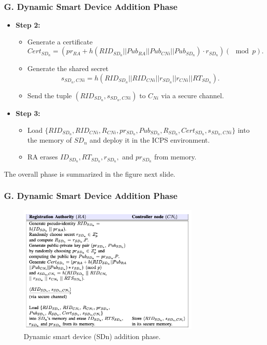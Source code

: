 \documentclass[9pt,handout]{beamer}
\begin{document}
\begin{frame}
    \frametitle{G. Dynamic Smart Device Addition Phase}
    \begin{itemize}
        
        
        \item \textbf{Step 2:} 
        \begin{itemize}
            \item Generate a certificate 
            \[
            Cert_{SD_n} = \left( pr_{RA} + h(RID_{SD_n} || Pub_{RA} || Pub_{CNi} || Pub_{SD_n}) \cdot r_{SD_n} \right) (\mod p).
            \]
            \item Generate the shared secret 
            \[
            s_{SD_n,CNi} = h(RID_{SD_n} || RID_{CNi} || r_{SD_n} || r_{CNi} || RT_{SD_n}).
            \]
            \item Send the tuple \( (RID_{SD_n}, s_{SD_n,CNi}) \) to \( C_{Ni} \) via a secure channel.
        \end{itemize}

        \item \textbf{Step 3:} 
        \begin{itemize}
            \item Load \( \{RID_{SD_n}, RID_{CNi}, R_{CNi}, pr_{SD_n}, Pub_{SD_n}, R_{SD_n}, Cert_{SD_n}, s_{SD_n,CNi}\} \) into the memory of \( SD_n \) and deploy it in the ICPS environment.
            \item RA erases \( ID_{SD_n}, RT_{SD_n}, r_{SD_n}, \) and \( pr_{SD_n} \) from memory.
        \end{itemize}
    \end{itemize}

    The overall phase is summarized in the figure next slide.

\end{frame}

\begin{frame}
    \frametitle{G. Dynamic Smart Device Addition Phase}

    \begin{figure}
        \centering
        \includegraphics[width=0.8\textwidth]{Fig5.png} 
        \caption{Dynamic smart device (SDn) addition phase.}
        \label{fig:SDn_addition_phase}
    \end{figure}

\end{frame}
\end{document}
